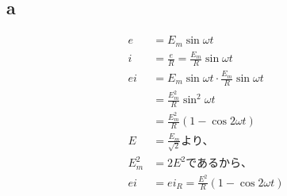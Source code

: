 \begin{flushleft}
  \subsection[short]{a}
  \begin{align*}
    e     &= E_m \sin \omega t \\
    i     &= \frac{e}{R} = \frac{E_m}{R} \sin \omega t \\
    ei    &= E_m \sin \omega t \cdot \frac{E_m}{R} \sin \omega t \\
          &= \frac{E_m^2}{R} \sin^2 \omega t \\
          &= \frac{E_m^2}{R} \left( 1 - \cos 2 \omega t \right) \\
    E     &= \frac{E_m}{\sqrt{2}} \text{より、} \\
    E_m^2 &= 2E^2 \text{であるから、} \\
    ei    &= ei_R = \frac{E^2}{R} \left( 1 - \cos 2 \omega t \right)
  \end{align*}


\end{flushleft}

